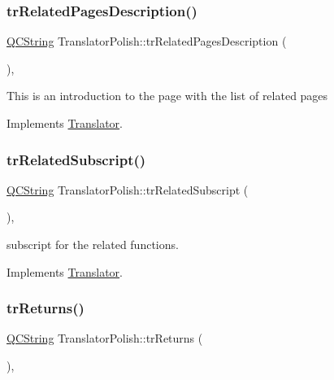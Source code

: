 \subsubsection{\texorpdfstring{trRelatedPagesDescription()}{trRelatedPagesDescription()}}
{\footnotesize\ttfamily \mbox{\hyperlink{class_q_c_string}{Q\+C\+String}} Translator\+Polish\+::tr\+Related\+Pages\+Description (\begin{DoxyParamCaption}{ }\end{DoxyParamCaption})\hspace{0.3cm}{\ttfamily [inline]}, {\ttfamily [virtual]}}

This is an introduction to the page with the list of related pages 

Implements \mbox{\hyperlink{class_translator}{Translator}}.

\mbox{\label{class_translator_polish_a1da09f00d1158c62a529fb714b8a9d5e}} 
\subsubsection{\texorpdfstring{trRelatedSubscript()}{trRelatedSubscript()}}
{\footnotesize\ttfamily \mbox{\hyperlink{class_q_c_string}{Q\+C\+String}} Translator\+Polish\+::tr\+Related\+Subscript (\begin{DoxyParamCaption}{ }\end{DoxyParamCaption})\hspace{0.3cm}{\ttfamily [inline]}, {\ttfamily [virtual]}}

subscript for the related functions. 

Implements \mbox{\hyperlink{class_translator}{Translator}}.

\mbox{\label{class_translator_polish_a2afd1448fafe6413751b7edc5086e24d}} 
\subsubsection{\texorpdfstring{trReturns()}{trReturns()}}
{\footnotesize\ttfamily \mbox{\hyperlink{class_q_c_string}{Q\+C\+String}} Translator\+Polish\+::tr\+Returns (\begin{DoxyParamCaption}{ }\end{DoxyParamCaption})\hspace{0.3cm}{\ttfamily [inline]}, {\ttfamily [virtual]}}

